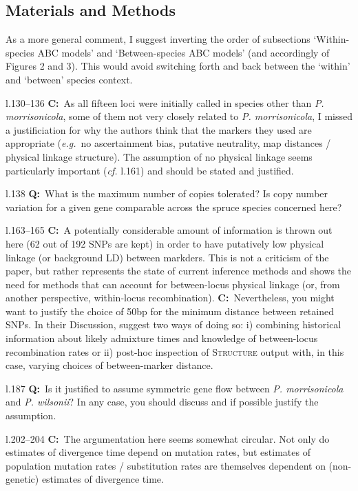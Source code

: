\documentclass[11pt]{article}
\newenvironment{my_description}
{\begin{description}
  \setlength{\itemsep}{2pt}
  \setlength{\parskip}{0pt}
  \setlength{\parsep}{0pt}}
{\end{description}}
\newcommand{\C}{\textbf{C:}\ }
\newcommand{\Q}{\textbf{Q:}\ }
\begin{document}
\subsection{Materials and Methods}
As a more general comment, I suggest inverting the order of subsections `Within-species ABC models' and `Between-species ABC models' (and accordingly of Figures 2 and 3). This would avoid switching forth and back between the `within' and `between' species context.

\begin{my_description}
	\item[l.130--136] \C As all fifteen loci were initially called in species other than \emph{P. morrisonicola}, some of them not very closely related to \emph{P. morrisonicola}, I missed a justificiation for why the authors think that the markers they used are appropriate (\emph{e.g.}\ no ascertainment bias, putative neutrality, map distances / physical linkage structure). The assumption of no physical linkage seems particularly important (\emph{cf.} l.161) and should be stated and justified.
	\item[l.138] \Q What is the maximum number of copies tolerated? Is copy number variation for a given gene comparable across the spruce species concerned here?
	\item[l.163--165] \C A potentially considerable amount of information is thrown out here (62 out of 192 SNPs are kept) in order to have putatively low physical linkage (or background LD) between markders. This is not a criticism of the paper, but rather represents the state of current inference methods and shows the need for methods that can account for between-locus physical linkage (or, from another perspective, within-locus recombination). \C Nevertheless, you might want to justify the choice of 50bp for the minimum distance between retained SNPs. In their Discussion, \citet[][]{Falush:2003fk}  suggest two ways of doing so: i) combining historical information about likely admixture times and knowledge of between-locus recombination rates or ii) post-hoc inspection of \textsc{Structure} output with, in this case, varying choices of between-marker distance.
	\item[l.187] \Q Is it justified to assume symmetric gene flow between \emph{P. morrisonicola} and \emph{P. wilsonii}? In any case, you should discuss and if possible justify the assumption.
	\item[l.202--204] \C The argumentation here seems somewhat circular. Not only do estimates of divergence time depend on mutation rates, but estimates of population mutation rates / substitution rates are themselves dependent on (non-genetic) estimates of divergence time.

\end{my_description}
\end{document}
